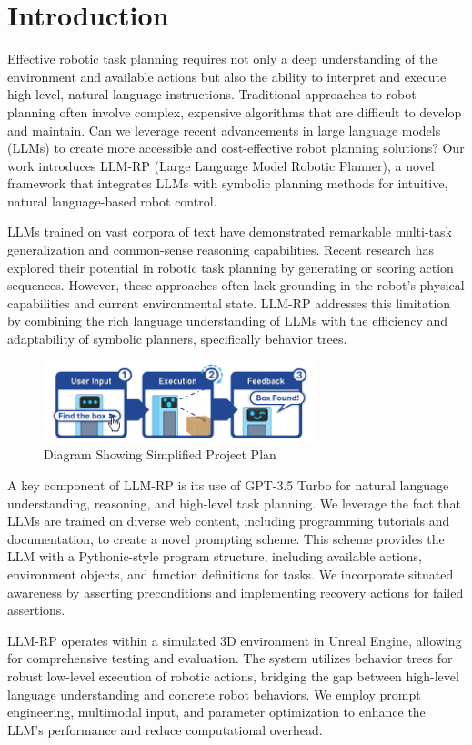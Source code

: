\documentclass[pdflatex,sn-mathphys-num]{sn-jnl}%
\theoremstyle{thmstyleone}%
\theoremstyle{thmstyletwo}%
\theoremstyle{thmstylethree}%
\begin{document}
\section{Introduction}\label{sec1}
Effective robotic task planning requires not only a deep understanding of the environment and available actions but also the ability to interpret and execute high-level, natural language instructions. Traditional approaches to robot planning often involve complex, expensive algorithms that are difficult to develop and maintain. Can we leverage recent advancements in large language models (LLMs) to create more accessible and cost-effective robot planning solutions? Our work introduces LLM-RP (Large Language Model Robotic Planner), a novel framework that integrates LLMs with symbolic planning methods for intuitive, natural language-based robot control.

LLMs trained on vast corpora of text have demonstrated remarkable multi-task generalization and common-sense reasoning capabilities. Recent research has explored their potential in robotic task planning by generating or scoring action sequences. However, these approaches often lack grounding in the robot's physical capabilities and current environmental state. LLM-RP addresses this limitation by combining the rich language understanding of LLMs with the efficiency and adaptability of symbolic planners, specifically behavior trees.
\begin{figure}[h]
\centering
\includegraphics[width=0.7\textwidth]{figures/Picture13.png}
\caption{Diagram Showing Simplified Project Plan}\label{fig1}
\end{figure}
A key component of LLM-RP is its use of GPT-3.5 Turbo for natural language understanding, reasoning, and high-level task planning. We leverage the fact that LLMs are trained on diverse web content, including programming tutorials and documentation, to create a novel prompting scheme. This scheme provides the LLM with a Pythonic-style program structure, including available actions, environment objects, and function definitions for tasks. We incorporate situated awareness by asserting preconditions and implementing recovery actions for failed assertions.

LLM-RP operates within a simulated 3D environment in Unreal Engine, allowing for comprehensive testing and evaluation. The system utilizes behavior trees for robust low-level execution of robotic actions, bridging the gap between high-level language understanding and concrete robot behaviors. We employ prompt engineering, multimodal input, and parameter optimization to enhance the LLM's performance and reduce computational overhead.
\end{document}
